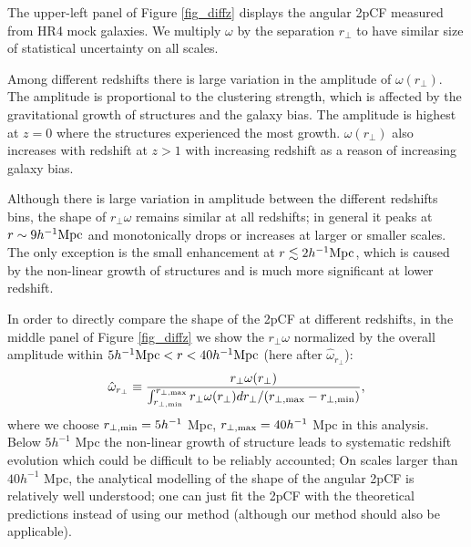 \documentclass[iop]{emulateapj}
\begin{document}
The upper-left panel of Figure \ref{fig_diffz} displays the angular 2pCF measured from HR4 mock galaxies. %
We multiply $\omega$ by the separation $r_\perp$ to have similar size of statistical uncertainty on all scales.

Among different redshifts there is large variation in the amplitude of $\omega(r_\perp)$.
The amplitude is proportional to the clustering strength, which is affected by the gravitational growth of structures and the galaxy bias.
The amplitude is highest at $z=0$ where the structures experienced the most growth.
$\omega(r_\perp)$ also increases with redshift at $z>1$ with increasing redshift 
as a reason of increasing galaxy bias.

Although there is large variation in amplitude between the different redshifts bins, 
the shape of $r_\perp\omega$  remains similar at all redshifts;
in general it peaks at $r\sim9 h^{-1}\rm Mpc$ and monotonically drops or increases at larger or smaller scales.
The only exception is the small enhancement at $r\lesssim 2 h^{-1}\rm Mpc$,
which is caused by the non-linear growth of structures 
and is much more significant at lower redshift.

In order to directly compare the shape of the 2pCF at different redshifts,
in the middle panel of Figure \ref{fig_diffz} 
we show the $r_\perp\omega$ normalized by the overall amplitude within 
$5h^{-1}{\rm Mpc} < r < 40h^{-1}{\rm Mpc}$
(here after $\hat \omega_{r_\perp}$):
\begin{equation}
 \hat \omega_{ r_\perp} \equiv  \frac{ {r_\perp\omega}(r_{\perp})}{ \int_{r_{\perp, \rm min}}^{r_{\perp, \rm max}}r_{\perp} \omega(r_{\perp}) d r_{\perp} / (r_{\perp,\rm max}-r_{\perp,\rm min}) },
\end{equation}
where we choose $r_{\perp, \rm min}=5 h^{-1}$ Mpc, $r_{\perp, \rm max}=40 h^{-1}$ Mpc in this analysis.
Below $5 h^{-1}$ Mpc the non-linear growth of structure 
leads to systematic redshift evolution which could be difficult to be reliably accounted;
On scales larger than $40 h^{-1}$ Mpc,
the analytical modelling of the shape of the angular 2pCF is relatively well understood;
one can just fit the 2pCF with the theoretical predictions \citep{Salvador2014,Salvador2016} 
instead of using our method 
(although our method should also be applicable).
\end{document}
